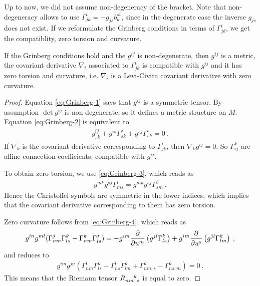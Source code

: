 Up to now, we did not assume non-degeneracy of the bracket. Note that non-degeneracy allows to use $\Gamma^{i}_{jk} = - g_{js} b^{si}_k$, since in the degenerate case the inverse $g_{js}$ does not exist. If we reformulate the Grinberg conditions in terms of $\Gamma^{i}_{jk}$, we get the compatiblity, zero torsion and curvature.

\begin{lemma}
    If the Grinberg conditions hold and the $g^{ij}$ is non-degenerate, then $g^{ij}$ is a metric, the covariant derivative $\nabla_i$ associated to $\Gamma^{i}_{jk}$ is compatible with $g^{ij}$ and it has zero torsion and curvature, i.e. $\nabla_i$ is a Levi-Civita covariant derivative with zero curvature.
\end{lemma}
\begin{proof}
    Equation \eqref{eq:Grinberg-1} says that $g^{ij}$ is a symmetric tensor. By assumption $\det g^{ij}$ is non-degenerate, so it defines a metric structure on $M$. Equation \eqref{eq:Grinberg-2} is equivalent to
    \begin{align}
        g^{ij}_{,k} + g^{is} \Gamma_{sk}^j + g^{sj} \Gamma_{sk}^i = 0 \:.
    \end{align}
    If $\nabla_k$ is the covariant derivative corresponding to $\Gamma^i_{jk}$, then $\nabla_k g^{ij} = 0$. So $\Gamma_{ij}^k$ are affine connection coefficients, compatible with $g^{ij}$.

    To obtain zero torsion, we use \eqref{eq:Grinberg-3}, which reads as 
    \begin{align}
        g^{mk} g^{sj} \Gamma^i_{ms} = g^{mk} g^{sj} \Gamma^i_{sm} \:.
    \end{align}
    Hence the Christoffel symbols are symmetric in the lower indices, which implies that the covariant derivative corresponding to them has zero torsion.

    Zero curvature follows from \eqref{eq:Grinberg-4}, which reads as
    \begin{align}
        g^{in} g^{ml} (\Gamma^j_{nm} \Gamma^{k}_{ls} - \Gamma^k_{nm} \Gamma^j_{ls}) = - g^{im} \frac{\partial }{\partial u^m} \left( g^{jl} \Gamma^k_{ls}\right) + g^{im} \frac{\partial }{\partial u^s}\left( g^{jl} \Gamma^k_{lm}\right) \:,
    \end{align}
    and reduces to
    \begin{align}
        g^{im} g^{jn} \left( \Gamma^{l}_{nm} \Gamma^{k}_{ls} - \Gamma^{l}_{ns} \Gamma^k_{lm} + \Gamma^k_{nm,s} - \Gamma^k_{ns,m} \right) = 0 \:.
    \end{align}
    This means that the Riemann tensor $R\indices{_n_m^k_s}$ is equal to zero.
\end{proof}


